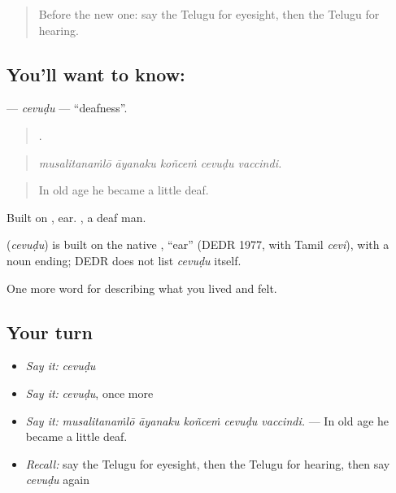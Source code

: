 \label{lesson:TE-C516-cevudu}



\begin{quote}
Before the new one: say the Telugu for eyesight, then the Telugu for hearing.
\end{quote}

\subsection*{You'll want to know: }
\textbf{} — \emph{cevuḍu} — \textquotedblleft{}deafness\textquotedblright{}.

\begin{quote}
    .
\end{quote}

\begin{quote}
\emph{musalitanaṁlō āyanaku koñceṁ cevuḍu vaccindi.}
\end{quote}

\begin{quote}
In old age he became a little deaf.
\end{quote}

Built on , ear. , a deaf man.

\begin{cousinweb}
\textbf{} (\emph{cevuḍu}) is built on the native , \textquotedblleft{}ear\textquotedblright{} (DEDR 1977, with Tamil \emph{cevi}), with a noun ending; DEDR does not list \emph{cevuḍu} itself.
\end{cousinweb}

\begin{grammarlens}[title={What you've built}]
One more word for describing what you lived and felt.
\end{grammarlens}

\subsection*{Your turn}
\begin{itemize}
\raggedright
  \item \emph{Say it:} \emph{cevuḍu}
  \item \emph{Say it:} \emph{cevuḍu}, once more
  \item \emph{Say it:} \emph{musalitanaṁlō āyanaku koñceṁ cevuḍu vaccindi.} — In old age he became a little deaf.
  \item \emph{Recall:} say the Telugu for eyesight, then the Telugu for hearing, then say \emph{cevuḍu} again
\end{itemize}

